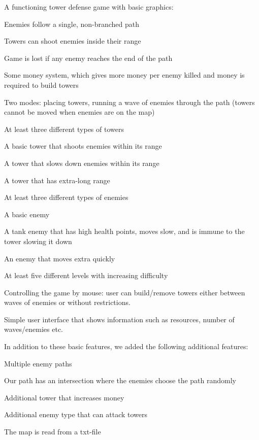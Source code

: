 \begin{DoxyItemize}
\item A functioning tower defense game with basic graphics\+:
\item Enemies follow a single, non-\/branched path
\item Towers can shoot enemies inside their range
\item Game is lost if any enemy reaches the end of the path
\item Some money system, which gives more money per enemy killed and money is required to build towers
\item Two modes\+: placing towers, running a wave of enemies through the path (towers cannot be moved when enemies are on the map)
\item At least three different types of towers
\begin{DoxyItemize}
\item A basic tower that shoots enemies within its range
\item A tower that slows down enemies within its range
\item A tower that has extra-\/long range ~\newline

\end{DoxyItemize}
\item At least three different types of enemies
\begin{DoxyItemize}
\item A basic enemy
\item A tank enemy that has high health points, moves slow, and is immune to the tower slowing it down
\item An enemy that moves extra quickly
\end{DoxyItemize}
\item At least five different levels with increasing difficulty
\item Controlling the game by mouse\+: user can build/remove towers either between waves of enemies or without restrictions.
\item Simple user interface that shows information such as resources, number of waves/enemies etc.
\end{DoxyItemize}

In addition to these basic features, we added the following additional features\+:


\begin{DoxyItemize}
\item Multiple enemy paths
\item Our path has an intersection where the enemies choose the path randomly
\item Additional tower that increases money
\item Additional enemy type that can attack towers
\item The map is read from a txt-\/file
\end{DoxyItemize}

